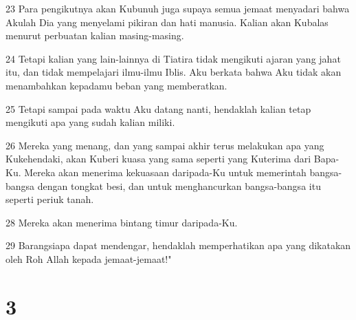 \par 23 Para pengikutnya akan Kubunuh juga supaya semua jemaat menyadari bahwa Akulah Dia yang menyelami pikiran dan hati manusia. Kalian akan Kubalas menurut perbuatan kalian masing-masing.
\par 24 Tetapi kalian yang lain-lainnya di Tiatira tidak mengikuti ajaran yang jahat itu, dan tidak mempelajari ilmu-ilmu Iblis. Aku berkata bahwa Aku tidak akan menambahkan kepadamu beban yang memberatkan.
\par 25 Tetapi sampai pada waktu Aku datang nanti, hendaklah kalian tetap mengikuti apa yang sudah kalian miliki.
\par 26 Mereka yang menang, dan yang sampai akhir terus melakukan apa yang Kukehendaki, akan Kuberi kuasa yang sama seperti yang Kuterima dari Bapa-Ku. Mereka akan menerima kekuasaan daripada-Ku untuk memerintah bangsa-bangsa dengan tongkat besi, dan untuk menghancurkan bangsa-bangsa itu seperti periuk tanah.
\par 28 Mereka akan menerima bintang timur daripada-Ku.
\par 29 Barangsiapa dapat mendengar, hendaklah memperhatikan apa yang dikatakan oleh Roh Allah kepada jemaat-jemaat!"

\chapter{3}

